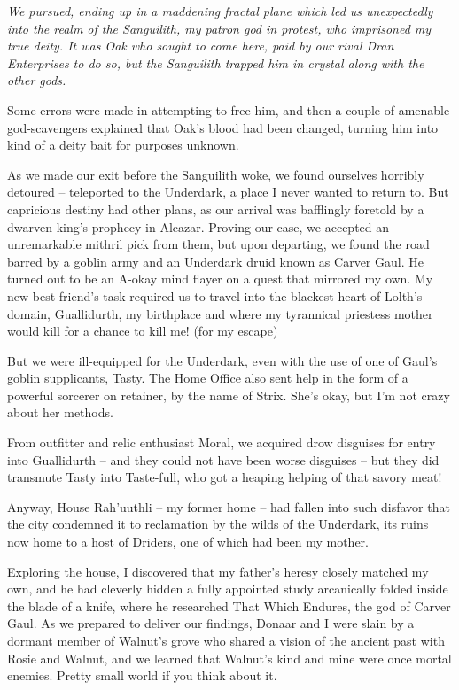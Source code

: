 \documentclass[a5paper,11pt]{memoir}
\makeatletter
\renewenvironment{drama}
  {\if@lnpa
   \PackageWarning{dramatist}{\lnpwarning{a}}
   \fi
   \if@lnps
   \PackageWarning{dramatist}{\lnpwarning{s}}
   \fi
   \begin{itemize}[labelwidth=\speakswidth,leftmargin=!]} 
  {\end{itemize}}
\newenvironment{pc}[1]
	{ \speaker{#1}\raggedright\itshape}
	{}
\makeatother
\begin{document}
{\begin{drama}
\begin{pc}{K'Thriss}
We pursued, ending up in a
maddening fractal plane which led us
unexpectedly into the realm of the
Sanguilith, my patron god in protest, who
imprisoned my true deity. It was Oak who
sought to come here, paid by our rival Dran
Enterprises to do so, but the Sanguilith
trapped him in crystal along with
the other gods. 

Some errors were made in
attempting to free him, and then a couple
of amenable god-scavengers explained that
Oak's blood had been changed, turning him
into kind of a deity bait for purposes
unknown.

As we made our exit before the Sanguilith
woke, we found ourselves horribly
detoured – teleported to the Underdark, a
place I never wanted to return to. But
capricious destiny had other plans, as
our arrival was bafflingly foretold by a
dwarven king's prophecy in Alcazar.
Proving our case, we accepted an
unremarkable mithril pick from them, but
upon departing, we found the road barred
by a goblin army and an Underdark druid
known as Carver Gaul. He turned out to be
an A-okay mind flayer on a quest that
mirrored my own. My new best friend's
task required us to travel into the
blackest heart of Lolth's domain, Guallidurth, 
my birthplace and where my
tyrannical priestess mother would kill
for a chance to kill me! (for my escape)

But we were ill-equipped for the
Underdark,
even with the use of one of Gaul's goblin
supplicants, Tasty. The Home Office also
sent help in the form of a powerful
sorcerer on retainer, by the name of
Strix. She's okay, but I'm not crazy
about her methods. 

From outfitter and relic
enthusiast Moral, we acquired drow 
disguises for entry into Guallidurth – 
and they could not have been worse
disguises – but they did transmute Tasty
into Taste-full, who got a heaping helping
of that savory meat! 

Anyway, House Rah'uuthli – 
my former home – had fallen into such
disfavor that the city condemned it to
reclamation by the wilds of the
Underdark, its ruins now home to a host
of Driders, one of which had been my
mother. 

Exploring the house, I discovered
that my father's heresy closely matched
my own, and he had cleverly hidden a
fully appointed study arcanically folded
inside the blade of a knife, where he
researched That Which Endures, the god of
Carver Gaul. As we prepared to deliver
our findings, Donaar and I were slain by a
dormant member of Walnut's grove who
shared a vision of the ancient past with
Rosie and Walnut, and we learned that
Walnut's kind and mine were once mortal
enemies. Pretty small world if you think about
it.


\end{pc}
\end{drama}}
\end{document}
